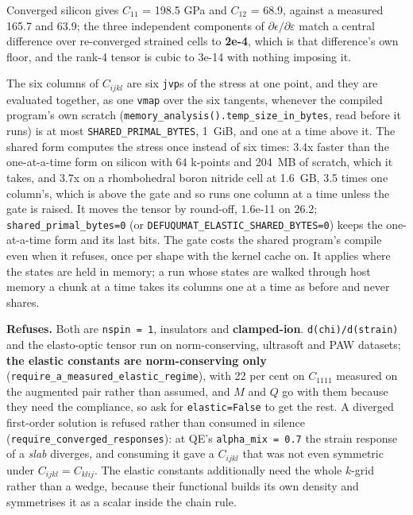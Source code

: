 \documentclass[11pt,a4paper]{article}
\newcommand{\code}[1]{\texttt{\small #1}}
\begin{document}
Converged silicon gives $C_{11}$ = 198.5 GPa and $C_{12}$ = 68.9, against a
measured 165.7 and 63.9; the three independent components of
$\partial\epsilon/\partial\varepsilon$ match a central difference over
re-converged strained cells to \textbf{2e-4}, which is that difference's own
floor, and the rank-4 tensor is cubic to 3e-14 with nothing imposing it.

\noindent The six columns of $C_{ijkl}$ are six \code{jvp}s of the stress at
one point, and they are evaluated together, as one \code{vmap} over the six
tangents, whenever the compiled program's own scratch
(\code{memory\_analysis().temp\_size\_in\_bytes}, read before it runs) is at
most \code{SHARED\_PRIMAL\_BYTES}, 1~GiB, and one at a time above it. The
shared form computes the stress once instead of six times: 3.4x faster than
the one-at-a-time form on silicon with 64 k-points and 204~MB of scratch, which
it takes, and 3.7x on a rhombohedral boron nitride cell at 1.6~GB, 3.5 times
one column's, which is
above the gate and so runs one column at a time unless the gate is raised. It
moves the tensor by round-off, 1.6e-11 on 26.2; \code{shared\_primal\_bytes=0} (or
\code{DEFUQUMAT\_ELASTIC\_SHARED\_BYTES=0}) keeps the one-at-a-time form and its
last bits. The gate costs the shared program's compile even when it refuses,
once per shape with the kernel cache on. It applies where the states are held
in memory; a run whose states are walked through host memory a chunk at a time
takes its columns one at a time as before and never shares.

\begin{refuses}
\textbf{Refuses.} Both are \code{nspin = 1}, insulators and
\textbf{clamped-ion}. \code{d(chi)/d(strain)} and the elasto-optic tensor run
on norm-conserving, ultrasoft and PAW datasets; \textbf{the elastic constants
are norm-conserving only} (\code{require\_a\_measured\_elastic\_regime}), with
22 per cent on $C_{1111}$ measured on the augmented pair rather than assumed,
and $M$ and $Q$ go with them because they need the compliance, so ask for
\code{elastic=False} to get the rest. A diverged first-order solution is
refused rather than consumed in silence
(\code{require\_converged\_responses}): at QE's \code{alpha\_mix = 0.7} the
strain response of a \emph{slab} diverges, and consuming it gave a $C_{ijkl}$
that was not even symmetric under $C_{ijkl} = C_{klij}$. The elastic constants
additionally need the whole $k$-grid rather than a wedge, because their
functional builds its own density and symmetrises it as a scalar inside the
chain rule.
\end{refuses}
\end{document}
